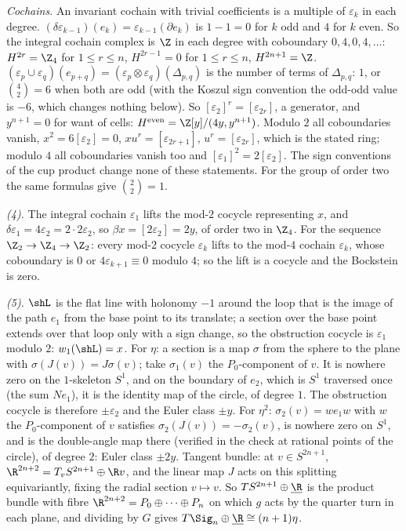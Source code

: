 \emph{Cochains.} An invariant cochain with trivial coefficients is a multiple of $\varepsilon_{k}$ in each degree. $(\delta\varepsilon_{k-1})(e_{k}) = \varepsilon_{k-1}(\partial e_{k})$ is $1 - 1 = 0$ for $k$ odd and $4$ for $k$ even. So the integral cochain complex is $\Z$ in each degree with coboundary $0, 4, 0, 4, \dots$: $H^{2r} = \Z_{4}$ for $1 \leq r \leq n$, $H^{2r-1} = 0$ for $1 \leq r \leq n$, $H^{2n+1} = \Z$. $(\varepsilon_{p} \cup \varepsilon_{q})(e_{p+q}) = (\varepsilon_{p} \otimes \varepsilon_{q})(\Delta_{p,q})$ is the number of terms of $\Delta_{p,q}$: $1$, or $\binom{4}{2} = 6$ when both are odd (with the Koszul sign convention the odd-odd value is $-6$, which changes nothing below). So $[\varepsilon_{2}]^{r} = [\varepsilon_{2r}]$, a generator, and $y^{n+1} = 0$ for want of cells: $H^{\mathrm{even}} = \Z[y]/(4y, y^{n+1})$. Modulo $2$ all coboundaries vanish, $x^{2} = 6[\varepsilon_{2}] = 0$, $xu^{r} = [\varepsilon_{2r+1}]$, $u^{r} = [\varepsilon_{2r}]$, which is the stated ring; modulo $4$ all coboundaries vanish too and $[\varepsilon_{1}]^{2} = 2[\varepsilon_{2}]$. The sign conventions of the cup product change none of these statements. For the group of order two the same formulas give $\binom{2}{2} = 1$.

\emph{(4).} The integral cochain $\varepsilon_{1}$ lifts the mod-$2$ cocycle representing $x$, and $\delta\varepsilon_{1} = 4\varepsilon_{2} = 2 \cdot 2\varepsilon_{2}$, so $\beta x = [2\varepsilon_{2}] = 2y$, of order two in $\Z_{4}$. For the sequence $\Z_{2} \to \Z_{4} \to \Z_{2}$: every mod-$2$ cocycle $\varepsilon_{k}$ lifts to the mod-$4$ cochain $\varepsilon_{k}$, whose coboundary is $0$ or $4\varepsilon_{k+1} \equiv 0$ modulo $4$; so the lift is a cocycle and the Bockstein is zero.

\emph{(5).} $\shL$ is the flat line with holonomy $-1$ around the loop that is the image of the path $e_{1}$ from the base point to its translate; a section over the base point extends over that loop only with a sign change, so the obstruction cocycle is $\varepsilon_{1}$ modulo $2$: $w_{1}(\shL) = x$. For $\eta$: a section is a map $\sigma$ from the sphere to the plane with $\sigma(J(v)) = J\sigma(v)$; take $\sigma_{1}(v)$ the $P_{0}$-component of $v$. It is nowhere zero on the $1$-skeleton $S^{1}$, and on the boundary of $e_{2}$, which is $S^{1}$ traversed once (the sum $Ne_{1}$), it is the identity map of the circle, of degree $1$. The obstruction cocycle is therefore $\pm\varepsilon_{2}$ and the Euler class $\pm y$. For $\eta^{2}$: $\sigma_{2}(v) = w e_{1} w$ with $w$ the $P_{0}$-component of $v$ satisfies $\sigma_{2}(J(v)) = -\sigma_{2}(v)$, is nowhere zero on $S^{1}$, and is the double-angle map there (verified in the check at rational points of the circle), of degree $2$: Euler class $\pm 2y$. Tangent bundle: at $v \in S^{2n+1}$, $\R^{2n+2} = T_{v}S^{2n+1} \oplus \R v$, and the linear map $J$ acts on this splitting equivariantly, fixing the radial section $v \mapsto v$. So $TS^{2n+1} \oplus \underline{\R}$ is the product bundle with fibre $\R^{2n+2} = P_{0} \oplus \dots \oplus P_{n}$ on which $g$ acts by the quarter turn in each plane, and dividing by $G$ gives $T\Sig_{n} \oplus \underline{\R} \cong (n+1)\eta$.

